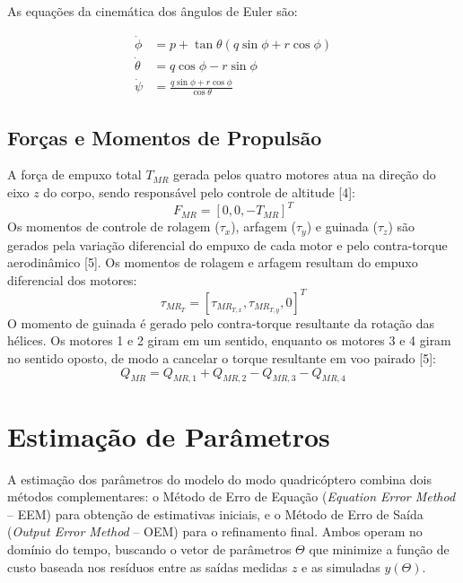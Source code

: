 \documentclass[letterpaper, 10 pt, conference]{ieeeconf}
\begin{document}
As equações da cinemática dos ângulos de Euler são:

\begin{align}
\dot{\phi} &= p + \tan\theta(q\sin\phi + r\cos\phi) \\
\dot{\theta} &= q\cos\phi - r\sin\phi \\
\dot{\psi} &= \frac{q\sin\phi + r\cos\phi}{\cos\theta}
\end{align}

\subsection{Forças e Momentos de Propulsão}

A força de empuxo total $T_{MR}$ gerada pelos quatro motores atua na direção do eixo $z$ do corpo, sendo responsável pelo controle de altitude [4]:
\begin{equation}
F_{MR} = [0, 0, -T_{MR}]^T
\end{equation}
Os momentos de controle de rolagem ($\tau_x$), arfagem ($\tau_y$) e guinada ($\tau_z$) são gerados pela variação diferencial do empuxo de cada motor e pelo contra-torque aerodinâmico [5]. Os momentos de rolagem e arfagem resultam do empuxo diferencial dos motores:
\begin{equation}
\tau_{MR_T} = [\tau_{MR_{T,x}}, \tau_{MR_{T,y}}, 0]^T
\end{equation}
O momento de guinada é gerado pelo contra-torque resultante da rotação das hélices. Os motores 1 e 2 giram em um sentido, enquanto os motores 3 e 4 giram no sentido oposto, de modo a cancelar o torque resultante em voo pairado [5]:
\begin{equation}
Q_{MR} = Q_{MR,1} + Q_{MR,2} - Q_{MR,3} - Q_{MR,4}
\end{equation}

\section{Estimação de Parâmetros}

A estimação dos parâmetros do modelo do modo quadricóptero combina dois métodos complementares: o Método de Erro de Equação (\textit{Equation Error Method} -- EEM) para obtenção de estimativas iniciais, e o Método de Erro de Saída (\textit{Output Error Method} -- OEM) para o refinamento final. Ambos operam no domínio do tempo, buscando o vetor de parâmetros $\Theta$ que minimize a função de custo baseada nos resíduos entre as saídas medidas $z$ e as simuladas $y(\Theta)$.
\end{document}
